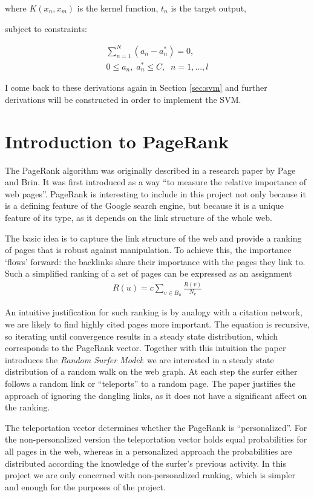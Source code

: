\documentclass[12pt,notitlepage,twoside]{scrbook}
\begin{document}
where \(K(x_n,x_m) \) is the kernel function, \(t_n\) is the target output,

subject to constraints:

\begin{gather}
  \sum_{n=1}^{N}(a_n-a_n^*)=0,\\
  0\leq a_n,\; a_n^*\leq C,\;\;    n=1,...,l 
\end{gather}

I come back to these derivations again in Section \ref{sec:svm} and further derivations
will be constructed in order to implement the SVM.
\section{Introduction to PageRank}
\label{prep:pr}
The PageRank algorithm was originally described in a research paper
by Page and Brin\cite{pagerank}. It was first introduced as a way ``to measure
the relative importance of web pages''. PageRank is interesting to include in
this project not only because it is a defining feature of the Google search
engine, but because it is a unique feature of its type, as it depends on the link
structure of the whole web.

The basic idea is to capture the link structure of the web and provide a
ranking of pages that is robust against manipulation. To achieve this, the
importance `flows' forward: the backlinks share their importance with the pages
they link to. Such a simplified ranking of a set of pages can be expressed as an assignment
\begin{gather}
  R(u)=c\sum_{v\in B_u}\frac{R(v)}{N_v}
\end{gather}

An intuitive justification for such ranking is by analogy with a citation
network, we are likely to find highly cited pages more important.
The equation is recursive, so iterating until convergence results in a steady
state distribution, which corresponds to the PageRank vector.
Together with this intuition the paper introduces the \textit{Random Surfer
Model}: we are interested in a steady state distribution of a random walk on
the web graph. At each step the surfer either follows a random link or
``teleports'' to a random page. The paper justifies the approach of ignoring the
dangling links, as it does not have a significant affect on the ranking. 

The teleportation vector determines whether the PageRank is ``personalized''. For
the non-personalized version the teleportation vector holds equal probabilities
for all pages in the web, whereas in a personalized approach the probabilities
are distributed according the knowledge of the surfer's previous activity. In
this project we are only concerned with non-personalized ranking, which is simpler and
enough for the purposes of the project.
\end{document}
